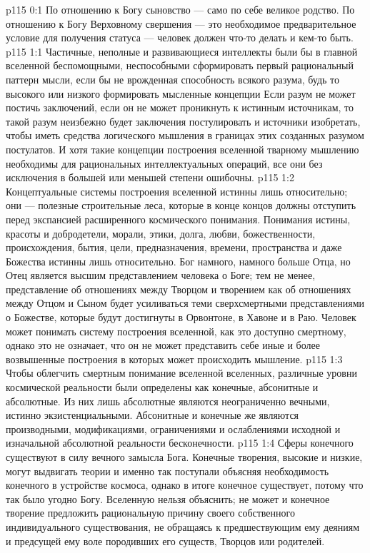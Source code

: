 \author{Могучий Вестник}
\vs p115 0:1 По отношению к Богу сыновство --- само по себе великое родство. По отношению к Богу Верховному свершения --- это необходимое предварительное условие для получения статуса --- человек должен что\hyp{}то делать и кем\hyp{}то быть.
\vs p115 1:1 Частичные, неполные и развивающиеся интеллекты были бы в главной вселенной беспомощными, неспособными сформировать первый рациональный паттерн мысли, если бы не врожденная способность всякого разума, будь то высокого или низкого формировать мысленные концепции  Если разум не может постичь заключений, если он не может проникнуть к истинным источникам, то такой разум неизбежно будет заключения постулировать и источники изобретать, чтобы иметь средства логического мышления в границах этих созданных разумом постулатов. И хотя такие концепции построения вселенной тварному мышлению необходимы для рациональных интеллектуальных операций, все они без исключения в большей или меньшей степени ошибочны.
\vs p115 1:2 Концептуальные системы построения вселенной истинны лишь относительно; они --- полезные строительные леса, которые в конце концов должны отступить перед экспансией расширенного космического понимания. Понимания истины, красоты и добродетели, морали, этики, долга, любви, божественности, происхождения, бытия, цели, предназначения, времени, пространства и даже Божества истинны лишь относительно. Бог намного, намного больше Отца, но Отец является высшим представлением человека о Боге; тем не менее, представление об отношениях между Творцом и творением как об отношениях между Отцом и Сыном будет усиливаться теми сверхсмертными представлениями о Божестве, которые будут достигнуты в Орвонтоне, в Хавоне и в Раю. Человек может понимать систему построения вселенной, как это доступно смертному, однако это не означает, что он не может представить себе иные и более возвышенные построения в которых может происходить мышление.
\vs p115 1:3 Чтобы облегчить смертным понимание вселенной вселенных, различные уровни космической реальности были определены как конечные, абсонитные и абсолютные. Из них лишь абсолютные являются неограниченно вечными, истинно экзистенциальными. Абсонитные и конечные же являются производными, модификациями, ограничениями и ослаблениями исходной и изначальной абсолютной реальности бесконечности.
\vs p115 1:4 Сферы конечного существуют в силу вечного замысла Бога. Конечные творения, высокие и низкие, могут выдвигать теории и именно так поступали объясняя необходимость конечного в устройстве космоса, однако в итоге конечное существует, потому что так было угодно Богу. Вселенную нельзя объяснить; не может и конечное творение предложить рациональную причину своего собственного индивидуального существования, не обращаясь к предшествующим ему деяниям и предсущей ему воле породивших его существ, Творцов или родителей.
